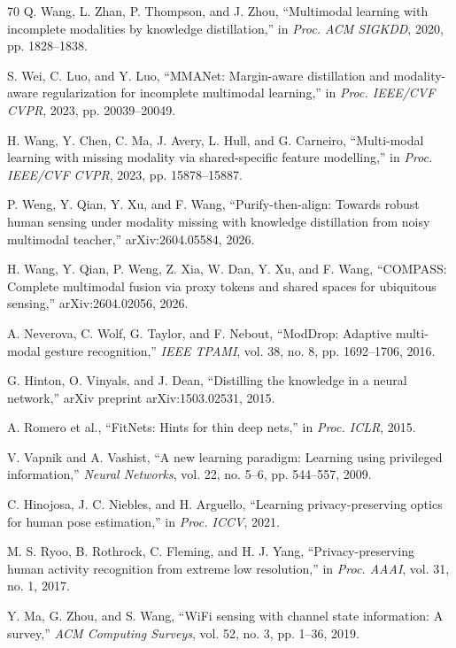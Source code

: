 \documentclass[journal]{IEEEtran}
\begin{document}
\begin{thebibliography}{70}
Q. Wang, L. Zhan, P. Thompson, and J. Zhou, ``Multimodal learning with incomplete modalities by knowledge distillation,'' in \emph{Proc. ACM SIGKDD}, 2020, pp. 1828--1838.

S. Wei, C. Luo, and Y. Luo, ``MMANet: Margin-aware distillation and modality-aware regularization for incomplete multimodal learning,'' in \emph{Proc. IEEE/CVF CVPR}, 2023, pp. 20039--20049.

H. Wang, Y. Chen, C. Ma, J. Avery, L. Hull, and G. Carneiro, ``Multi-modal learning with missing modality via shared-specific feature modelling,'' in \emph{Proc. IEEE/CVF CVPR}, 2023, pp. 15878--15887.

P. Weng, Y. Qian, Y. Xu, and F. Wang, ``Purify-then-align: Towards robust human sensing under modality missing with knowledge distillation from noisy multimodal teacher,'' arXiv:2604.05584, 2026.

H. Wang, Y. Qian, P. Weng, Z. Xia, W. Dan, Y. Xu, and F. Wang, ``COMPASS: Complete multimodal fusion via proxy tokens and shared spaces for ubiquitous sensing,'' arXiv:2604.02056, 2026.

A. Neverova, C. Wolf, G. Taylor, and F. Nebout, ``ModDrop: Adaptive multi-modal gesture recognition,'' \emph{IEEE TPAMI}, vol. 38, no. 8, pp. 1692--1706, 2016.

G. Hinton, O. Vinyals, and J. Dean, ``Distilling the knowledge in a neural network,'' arXiv preprint arXiv:1503.02531, 2015.

A. Romero et al., ``FitNets: Hints for thin deep nets,'' in \emph{Proc. ICLR}, 2015.

V. Vapnik and A. Vashist, ``A new learning paradigm: Learning using privileged information,'' \emph{Neural Networks}, vol. 22, no. 5--6, pp. 544--557, 2009.

C. Hinojosa, J. C. Niebles, and H. Arguello, ``Learning privacy-preserving optics for human pose estimation,'' in \emph{Proc. ICCV}, 2021.

M. S. Ryoo, B. Rothrock, C. Fleming, and H. J. Yang, ``Privacy-preserving human activity recognition from extreme low resolution,'' in \emph{Proc. AAAI}, vol. 31, no. 1, 2017.

Y. Ma, G. Zhou, and S. Wang, ``WiFi sensing with channel state information: A survey,'' \emph{ACM Computing Surveys}, vol. 52, no. 3, pp. 1--36, 2019.


\end{thebibliography}
\end{document}

